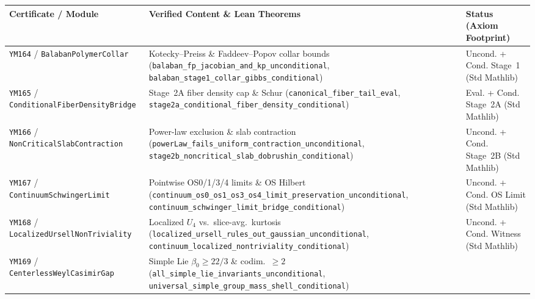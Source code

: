 \documentclass[11pt,a4paper]{article}
\begin{document}
\begin{table}[ht]
\centering
\footnotesize
\setlength{\tabcolsep}{4pt}
\begin{tabular}{@{}p{4.3cm}p{6.6cm}p{3.4cm}@{}}
\hline
\textbf{Certificate / Module} & \textbf{Verified Content \& Lean Theorems} & \textbf{Status (Axiom Footprint)} \\
\hline
\texttt{YM164} / \texttt{BalabanPolymer\allowbreak Collar} &
Kotecky--Preiss \& Faddeev--Popov collar bounds (\texttt{balaban\_\allowbreak fp\_\allowbreak jacobian\_\allowbreak and\_\allowbreak kp\_\allowbreak unconditional}, \texttt{balaban\_\allowbreak stage1\_\allowbreak collar\_\allowbreak gibbs\_\allowbreak conditional}) &
Uncond. + Cond. Stage~1 (Std Mathlib) \\
\texttt{YM165} / \texttt{ConditionalFiber\allowbreak DensityBridge} &
Stage~2A fiber density cap \& Schur (\texttt{canonical\_\allowbreak fiber\_\allowbreak tail\_\allowbreak eval}, \texttt{stage2a\_\allowbreak conditional\_\allowbreak fiber\_\allowbreak density\_\allowbreak conditional}) &
Eval. + Cond. Stage~2A (Std Mathlib) \\
\texttt{YM166} / \texttt{NonCriticalSlab\allowbreak Contraction} &
Power-law exclusion \& slab contraction (\texttt{powerLaw\_\allowbreak fails\_\allowbreak uniform\_\allowbreak contraction\_\allowbreak unconditional}, \texttt{stage2b\_\allowbreak noncritical\_\allowbreak slab\_\allowbreak dobrushin\_\allowbreak conditional}) &
Uncond. + Cond. Stage~2B (Std Mathlib) \\
\texttt{YM167} / \texttt{Continuum\allowbreak SchwingerLimit} &
Pointwise OS0/1/3/4 limits \& OS Hilbert (\texttt{continuum\_\allowbreak os0\_\allowbreak os1\_\allowbreak os3\_\allowbreak os4\_\allowbreak limit\_\allowbreak preservation\_\allowbreak unconditional}, \texttt{continuum\_\allowbreak schwinger\_\allowbreak limit\_\allowbreak bridge\_\allowbreak conditional}) &
Uncond. + Cond. OS Limit (Std Mathlib) \\
\texttt{YM168} / \texttt{LocalizedUrsell\allowbreak NonTriviality} &
Localized $U_4$ vs.\ slice-avg.\ kurtosis (\texttt{localized\_\allowbreak ursell\_\allowbreak rules\_\allowbreak out\_\allowbreak gaussian\_\allowbreak unconditional}, \texttt{continuum\_\allowbreak localized\_\allowbreak nontriviality\_\allowbreak conditional}) &
Uncond. + Cond. Witness (Std Mathlib) \\
\texttt{YM169} / \texttt{CenterlessWeyl\allowbreak CasimirGap} &
Simple Lie $\beta_0 \ge 22/3$ \& codim.\ $\ge 2$ (\texttt{all\_\allowbreak simple\_\allowbreak lie\_\allowbreak invariants\_\allowbreak unconditional}, \texttt{universal\_\allowbreak simple\_\allowbreak group\_\allowbreak mass\_\allowbreak shell\_\allowbreak conditional}) &

\end{tabular}
\end{table}
\end{document}
